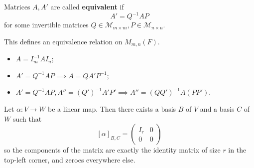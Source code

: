 \documentclass[a4paper,11pt]{article}
\begin{document}
\begin{definition}
	Matrices $ A, A' $ are called \textbf{equivalent} if
	\[
		A' = Q^{-1}AP
	\]
	for some invertible matrices $ Q\in \mathcal{M}_{m \times m}, P\in \mathcal{M}_{n \times n} $.
\end{definition}
\begin{remark}
	This defines an equivalence relation on $ M_{m,n}(F) $.
	\begin{itemize}
		\item $ A = I_m^{-1} A I_n $;
		\item $ A' = Q^{-1} AP \implies A = Q A' P^{-1} $;
		\item $ A' = Q^{-1}AP, A'' = (Q')^{-1}A'P' \implies A'' = (QQ')^{-1}A(PP') $.
	\end{itemize}
\end{remark}
\begin{proposition}
	Let $ \alpha \colon V \to W $ be a linear map.
	Then there exists a basis $ B $ of $ V $ and a basis $ C $ of $ W $ such that
	\[
		[\alpha]_{B,C} = \begin{pmatrix}
			I_r & 0 \\
			0   & 0
		\end{pmatrix}
	\]
	so the components of the matrix are exactly the identity matrix of size $ r $ in the top-left corner, and zeroes everywhere else.
\end{proposition}
\end{document}
